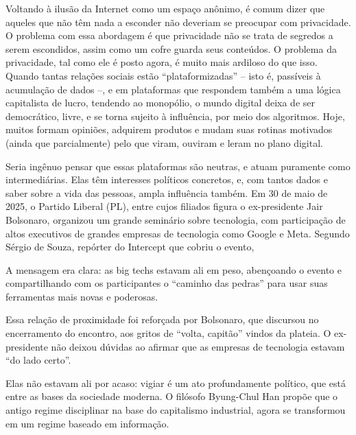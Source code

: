 Voltando à ilusão da Internet como um espaço anônimo, é comum dizer que aqueles que não têm nada a esconder não deveriam se preocupar com privacidade.
O problema com essa abordagem é que privacidade não se trata de segredos a serem escondidos, assim como um cofre guarda seus conteúdos.
O problema da privacidade, tal como ele é posto agora, é muito mais ardiloso do que isso.
Quando tantas relações sociais estão ``plataformizadas'' -- isto é, passíveis à acumulação de dados --, e em plataformas que respondem também a uma lógica capitalista de lucro, tendendo ao monopólio, o mundo digital deixa de ser democrático, livre, e se torna sujeito à influência, por meio dos algoritmos.
Hoje, muitos formam opiniões, adquirem produtos e mudam suas rotinas motivados (ainda que parcialmente) pelo que viram, ouviram e leram no plano digital.

Seria ingênuo pensar que essas plataformas são neutras, e atuam puramente como intermediárias.
Elas têm interesses políticos concretos, e, com tantos dados e saber sobre a vida das pessoas, ampla influência também.
Em 30 de maio de 2025, o Partido Liberal (PL), entre cujos filiados figura o ex-presidente Jair Bolsonaro, organizou um grande seminário sobre tecnologia, com participação de altos executivos de grandes empresas de tecnologia como Google e Meta. 
Segundo Sérgio de Souza, repórter do Intercept que cobriu o evento,

\begin{quoting}
    A mensagem era clara: as big techs estavam ali em peso, abençoando o evento e compartilhando com os participantes o “caminho das pedras” para usar suas ferramentas mais novas e poderosas.

    Essa relação de proximidade foi reforçada por Bolsonaro, que discursou no encerramento do encontro, aos gritos de “volta, capitão” vindos da plateia. O ex-presidente não deixou dúvidas ao afirmar que as empresas de tecnologia estavam ``do lado certo''. \cite{desouza_treinamento_2025}
\end{quoting}

Elas não estavam ali por acaso: vigiar é um ato profundamente político, que está entre as bases da sociedade moderna. 
O filósofo Byung-Chul Han propõe que o antigo regime disciplinar na base do capitalismo industrial, agora se transformou em um regime baseado em informação.

